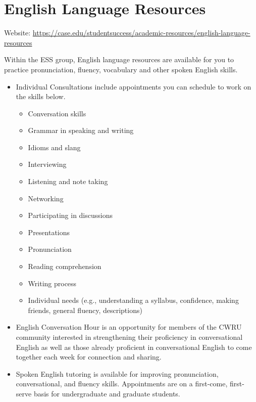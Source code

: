 \documentclass[
]{book}
\providecommand{\tightlist}{%
  \setlength{\itemsep}{0pt}\setlength{\parskip}{0pt}}
\begin{document}
\hypertarget{english-language-resources}{%
\section{English Language Resources}\label{english-language-resources}}

Website: \url{https://case.edu/studentsuccess/academic-resources/english-language-resources}

Within the ESS group, English language resources are available for you to practice pronunciation, fluency, vocabulary and other spoken English skills.

\begin{itemize}
\tightlist
\item
  Individual Consultations include appointments you can schedule to work on the skills below.

  \begin{itemize}
  \tightlist
  \item
    Conversation skills
  \item
    Grammar in speaking and writing
  \item
    Idioms and slang
  \item
    Interviewing
  \item
    Listening and note taking
  \item
    Networking
  \item
    Participating in discussions
  \item
    Presentations
  \item
    Pronunciation
  \item
    Reading comprehension
  \item
    Writing process
  \item
    Individual needs (e.g., understanding a syllabus, confidence, making friends, general fluency, descriptions)
  \end{itemize}
\item
  English Conversation Hour is an opportunity for members of the CWRU community interested in strengthening their proficiency in conversational English as well as those already proficient in conversational English to come together each week for connection and sharing.
\item
  Spoken English tutoring is available for improving pronunciation, conversational, and fluency skills. Appointments are on a first-come, first-serve basis for undergraduate and graduate students.
\end{itemize}
\end{document}
